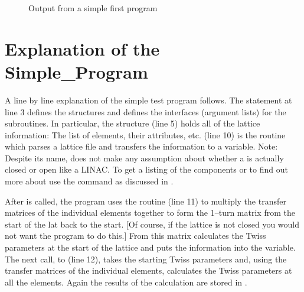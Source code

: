 \begin{figure}[ht]
\caption{Output from a simple first program}
\label{f:output}
\end{figure}

\section{Explanation of the Simple_Program}

A line by line explanation of the simple test program follows. 
The  statement at line 3
defines the \bmad structures and defines the interfaces
(argument lists) for the \bmad subroutines. In particular, the
 structure (line 5) holds all of the lattice
information: The list of elements, their attributes,
etc.  (line 10) is the routine which parses a lattice
file and transfers the information to a
 variable. Note: Despite its name, \bmad does
not make any assumption about whether a  is actually
closed or open like a LINAC. To get a listing of the 
components or to find out more about  use the 
command as discussed in .

After  is called, the program uses the
routine  (line 11) to multiply the transfer
matrices of the individual elements together to form the 1--turn
matrix from the start of the lat back to the start. [Of course,
if the lattice is not closed you would not want the program to do
this.] From this matrix
 calculates the Twiss parameters at the start of
the lattice and puts the information into the  variable. The
next call, to  (line 12), takes the starting
Twiss parameters and, using the transfer matrices of the individual
elements, calculates the Twiss parameters at all the elements. Again
the results of the calculation are stored in . 

